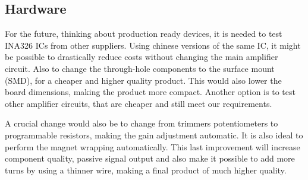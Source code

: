 \subsection{Hardware}
For the future, thinking about production ready devices, it is needed to test INA326 ICs
from other suppliers. Using chinese versions of the same IC, it might be possible to
drastically reduce costs without changing the main amplifier circuit.
Also to change the through-hole components to the surface mount (SMD), for a cheaper and higher
quality  product. This would also lower the board dimensions, making the product more compact.
Another option is to test other amplifier circuits, that are cheaper and still meet our requirements.

A crucial change would also be to change from trimmers potentiometers to programmable
resistors, making the gain adjustment automatic.
It is also ideal to perform the magnet wrapping automatically. This last improvement will increase
component quality, passive signal output and also make it possible
to add more turns by using a thinner wire, making a final product of much higher quality.

